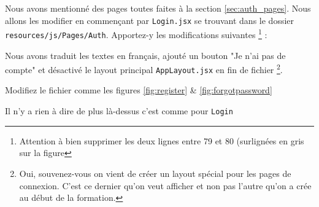Nous avons mentionné des pages toutes faites à la section \ref{sec:auth_pages}. Nous allons les modifier en commençant par \texttt{Login.jsx} se trouvant dans le dossier \texttt{resources/js/Pages/Auth}. Apportez-y les modifications suivantes \footnote{Attention à bien supprimer les deux lignes entre 79 et 80 (surlignées en gris sur la figure} :

Nous avons traduit les textes en français, ajouté un bouton "Je n'ai pas de compte" et désactivé le layout principal \texttt{AppLayout.jsx} en fin de fichier \footnote{Oui, souvenez-vous on vient de créer un layout spécial pour les pages de connexion. C'est ce dernier qu'on veut afficher et non pas l'autre qu'on a crée au début de la formation.}.


Modifiez le fichier comme les figures \ref{fig:register} \& \ref{fig:forgotpassword}

Il n'y a rien à dire de plus là-dessus c'est comme pour \texttt{Login}

